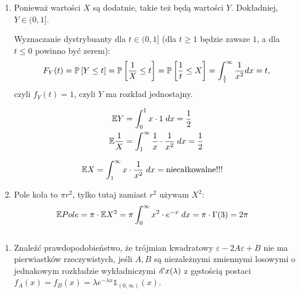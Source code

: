 \documentclass{article}
\begin{document}
\begin{enumerate}[label=(\alph*)]
  \item Ponieważ wartości $X$ są dodatnie, takie też będą wartości $Y$. Dokładniej, $Y\in (0, 1]$.

    Wyznaczanie dystrybuanty dla $t\in (0, 1]$ (dla $t\geq 1$ będzie zawsze $1$, a dla $t\leq 0$ powinno być zerem):
    $$F_Y(t)=\prob{Y\leq t}=\prob{\frac{1}{X}\leq t}=\prob{\frac{1}{t}\leq X}=\int_{\frac{1}{t}}^\infty\frac{1}{x^2}dx=t,$$
    czyli $f_Y(t)=1$, czyli $Y$ ma rozkład jednostajny.

    \begin{align*}
      \mathbb{E} Y&=\int_0^1x\cdot 1\;dx=\frac{1}{2}\\
      \mathbb{E}\frac{1}{X}&=\int_1^\infty\frac{1}{x}\cdot\frac{1}{x^2}\;dx=\frac{1}{2}
    \end{align*}

    \begin{align*}
      \mathbb{E} X&=\int_1^\infty x\cdot\frac{1}{x^2}\;dx=\text{niecałkowalne!!!}
    \end{align*}

  \item Pole koła to $\pi r^2$, tylko tutaj zamiast $r^2$ używam $X^2$:
    \begin{align*}
      \mathbb{E} Pole&=\pi\cdot\mathbb{E} X^2=\pi\int_0^\infty x^2\cdot e^{-x}\;dx=\pi\cdot\Gamma(3)=2\pi
    \end{align*}
\end{enumerate}

\begin{problem}{} $ $\newline
  \begin{enumerate}[label=(\alph*)]
    \item Znaleźć prawdopodobieństwo, że trójmian kwadratowy $\varepsilon-2A\varepsilon+B$ nie ma pierwiastków rzeczywistych, jeśli $A,B$ są niezależnymi zmiennymi losowymi o jednakowym rozkładzie wykładniczymi $\mathcal{E}x(\lambda)$ z gęstością postaci $f_A(x)=f_B(x)=\lambda e^{-\lambda x}\mathds{1}_{(0,\infty)}(x)$.
  \end{enumerate}
\end{problem}
\end{document}
